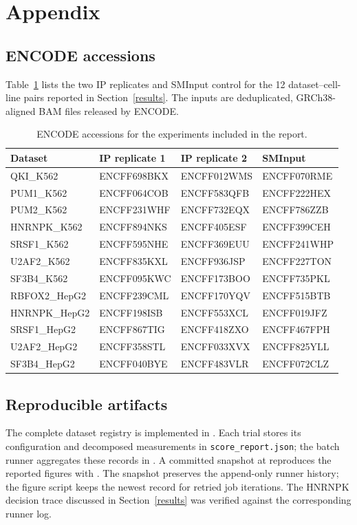 \section{Appendix}
\label{appendix}

\subsection{ENCODE accessions}

Table~\ref{tab:accessions} lists the two IP replicates and SMInput control for the
12 dataset--cell-line pairs reported in Section~\ref{results}. The inputs are deduplicated,
GRCh38-aligned BAM files released by ENCODE.

\begin{table}[H]
\centering
\scriptsize
\setlength{\tabcolsep}{4pt}
\begin{tabular}{@{}llll@{}}
\toprule
Dataset & IP replicate 1 & IP replicate 2 & SMInput \\
\midrule
QKI\_K562    & ENCFF698BKX & ENCFF012WMS & ENCFF070RME \\
PUM1\_K562   & ENCFF064COB & ENCFF583QFB & ENCFF222HEX \\
PUM2\_K562   & ENCFF231WHF & ENCFF732EQX & ENCFF786ZZB \\
HNRNPK\_K562 & ENCFF894NKS & ENCFF405ESF & ENCFF399CEH \\
SRSF1\_K562  & ENCFF595NHE & ENCFF369EUU & ENCFF241WHP \\
U2AF2\_K562  & ENCFF835KXL & ENCFF936JSP & ENCFF227TON \\
SF3B4\_K562  & ENCFF095KWC & ENCFF173BOO & ENCFF735PKL \\
RBFOX2\_HepG2& ENCFF239CML & ENCFF170YQV & ENCFF515BTB \\
HNRNPK\_HepG2& ENCFF198ISB & ENCFF553XCL & ENCFF019JFZ \\
SRSF1\_HepG2 & ENCFF867TIG & ENCFF418ZXO & ENCFF467FPH \\
U2AF2\_HepG2 & ENCFF358STL & ENCFF033XVX & ENCFF825YLL \\
SF3B4\_HepG2 & ENCFF040BYE & ENCFF483VLR & ENCFF072CLZ \\
\bottomrule
\end{tabular}
\caption{ENCODE accessions for the experiments included in the report.}
\label{tab:accessions}
\end{table}

\subsection{Reproducible artifacts}

The complete dataset registry is implemented in
. Each trial stores its
configuration and decomposed measurements in \texttt{score\_report.json}; the
batch runner aggregates these records in
. A committed snapshot at
 reproduces the reported
figures with . The snapshot preserves
the append-only runner history; the figure script keeps the newest record for
retried job iterations. The HNRNPK decision trace discussed in
Section~\ref{results} was verified against the corresponding runner log.

